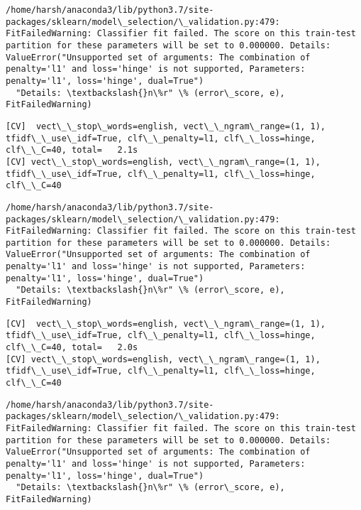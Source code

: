 \documentclass[11pt]{article}
\begin{document}
    \begin{Verbatim}[commandchars=\\\{\}]
/home/harsh/anaconda3/lib/python3.7/site-packages/sklearn/model\_selection/\_validation.py:479: FitFailedWarning: Classifier fit failed. The score on this train-test partition for these parameters will be set to 0.000000. Details: 
ValueError("Unsupported set of arguments: The combination of penalty='l1' and loss='hinge' is not supported, Parameters: penalty='l1', loss='hinge', dual=True")
  "Details: \textbackslash{}n\%r" \% (error\_score, e), FitFailedWarning)

    \end{Verbatim}

    \begin{Verbatim}[commandchars=\\\{\}]
[CV]  vect\_\_stop\_words=english, vect\_\_ngram\_range=(1, 1), tfidf\_\_use\_idf=True, clf\_\_penalty=l1, clf\_\_loss=hinge, clf\_\_C=40, total=   2.1s
[CV] vect\_\_stop\_words=english, vect\_\_ngram\_range=(1, 1), tfidf\_\_use\_idf=True, clf\_\_penalty=l1, clf\_\_loss=hinge, clf\_\_C=40 

    \end{Verbatim}

    \begin{Verbatim}[commandchars=\\\{\}]
/home/harsh/anaconda3/lib/python3.7/site-packages/sklearn/model\_selection/\_validation.py:479: FitFailedWarning: Classifier fit failed. The score on this train-test partition for these parameters will be set to 0.000000. Details: 
ValueError("Unsupported set of arguments: The combination of penalty='l1' and loss='hinge' is not supported, Parameters: penalty='l1', loss='hinge', dual=True")
  "Details: \textbackslash{}n\%r" \% (error\_score, e), FitFailedWarning)

    \end{Verbatim}

    \begin{Verbatim}[commandchars=\\\{\}]
[CV]  vect\_\_stop\_words=english, vect\_\_ngram\_range=(1, 1), tfidf\_\_use\_idf=True, clf\_\_penalty=l1, clf\_\_loss=hinge, clf\_\_C=40, total=   2.0s
[CV] vect\_\_stop\_words=english, vect\_\_ngram\_range=(1, 1), tfidf\_\_use\_idf=True, clf\_\_penalty=l1, clf\_\_loss=hinge, clf\_\_C=40 

    \end{Verbatim}

    \begin{Verbatim}[commandchars=\\\{\}]
/home/harsh/anaconda3/lib/python3.7/site-packages/sklearn/model\_selection/\_validation.py:479: FitFailedWarning: Classifier fit failed. The score on this train-test partition for these parameters will be set to 0.000000. Details: 
ValueError("Unsupported set of arguments: The combination of penalty='l1' and loss='hinge' is not supported, Parameters: penalty='l1', loss='hinge', dual=True")
  "Details: \textbackslash{}n\%r" \% (error\_score, e), FitFailedWarning)

    \end{Verbatim}
\end{document}
